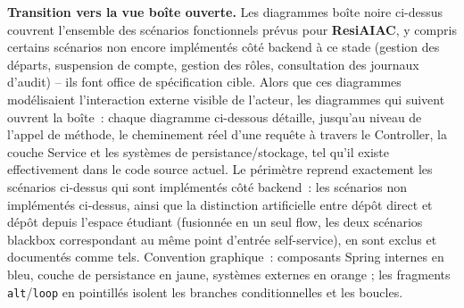 \documentclass[a4paper,12pt]{article}
\newcommand{\drawactor}[3]{
  \begin{scope}[shift={(#1)}]
    \draw[thick, fill=blue!10] (0,1.8) circle (0.20); %
    \draw[thick] (0,1.6) -- (0,0.9); %
    \draw[thick] (-0.35,1.3) -- (0.35,1.3); %
    \draw[thick] (0,0.9) -- (-0.2,0.4); %
    \draw[thick] (0,0.9) -- (0.2,0.4); %
    \node[font=\bfseries, anchor=north] (#1_label) at (0, 0.15) {#2};
  \end{scope}
  \coordinate (#1_top) at (#1_label.south);
  \draw[dashed, thick, black!40] (#1_top) -- ++(0,-#3) coordinate (#1_bot);
}
\newcommand{\drawapp}[3]{
  \node[draw, fill=green!15, minimum width=3.2cm, minimum height=0.8cm, rounded corners, font=\bfseries] (#1_node) at (#1) {#2};
  \coordinate (#1_top) at (#1_node.south);
  \draw[dashed, thick, black!40] (#1_top) -- ++(0,-#3) coordinate (#1_bot);
}
\begin{document}
\begin{center}
\end{center}

\textbf{Transition vers la vue boîte ouverte.} Les diagrammes boîte noire ci-dessus couvrent l'ensemble des scénarios fonctionnels prévus pour \textbf{ResiAIAC}, y compris certains scénarios non encore implémentés côté backend à ce stade (gestion des départs, suspension de compte, gestion des rôles, consultation des journaux d'audit) -- ils font office de spécification cible. Alors que ces diagrammes modélisaient l'interaction externe visible de l'acteur, les diagrammes qui suivent ouvrent la boîte~: chaque diagramme ci-dessous détaille, jusqu'au niveau de l'appel de méthode, le cheminement réel d'une requête à travers le Controller, la couche Service et les systèmes de persistance/stockage, tel qu'il existe effectivement dans le code source actuel. Le périmètre reprend exactement les scénarios ci-dessus qui sont implémentés côté backend~: les scénarios non implémentés ci-dessus, ainsi que la distinction artificielle entre dépôt direct et dépôt depuis l'espace étudiant (fusionnée en un seul flow, les deux scénarios blackbox correspondant au même point d'entrée self-service), en sont exclus et documentés comme tels. Convention graphique~: composants Spring internes en bleu, couche de persistance en jaune, systèmes externes en orange ; les fragments \texttt{alt}/\texttt{loop} en pointillés isolent les branches conditionnelles et les boucles.
\end{document}
